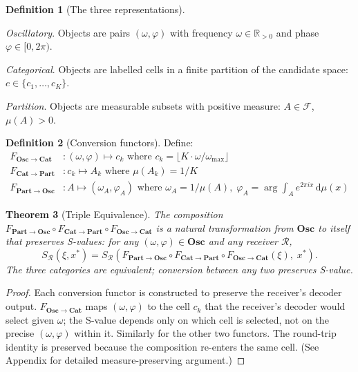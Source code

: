 \documentclass[twocolumn,11pt,a4paper]{article}
\newtheorem{theorem}{Theorem}[section]
\theoremstyle{definition}
\newtheorem{definition}[theorem]{Definition}
\theoremstyle{remark}
\newcommand{\Recv}{\mathcal{R}}
\newcommand{\Osc}{\mathbf{Osc}}
\newcommand{\Cat}{\mathbf{Cat}}
\newcommand{\Part}{\mathbf{Part}}
\begin{document}
\begin{definition}[The three representations]
\label{def:threereps}
\begin{description}[noitemsep,topsep=2pt]
\item[$\Osc$:] \emph{Oscillatory}. Objects are pairs $(\omega, \varphi)$
  with frequency $\omega \in \mathbb{R}_{>0}$ and phase $\varphi \in
  [0, 2\pi)$.
\item[$\Cat$:] \emph{Categorical}. Objects are labelled cells in a finite
  partition of the candidate space: $c \in \{c_1, \ldots, c_K\}$.
\item[$\Part$:] \emph{Partition}. Objects are measurable subsets with
  positive measure: $A \in \mathscr{F}$, $\mu(A) > 0$.
\end{description}
\end{definition}

\begin{definition}[Conversion functors]
Define:
\begin{align*}
F_{\Osc \to \Cat} &: (\omega, \varphi) \mapsto c_k
  \text{ where } c_k = \lfloor K \cdot \omega / \omega_{\max} \rfloor\\
F_{\Cat \to \Part} &: c_k \mapsto A_k
  \text{ where } \mu(A_k) = 1/K\\
F_{\Part \to \Osc} &: A \mapsto (\omega_A, \varphi_A)
  \text{ where } \omega_A = 1/\mu(A),\; \varphi_A = \arg\int_A e^{2\pi i x}\,\mathrm{d}\mu(x)
\end{align*}
\end{definition}

\begin{theorem}[Triple Equivalence]
\label{thm:triple}
The composition $F_{\Part \to \Osc} \circ F_{\Cat \to \Part} \circ
F_{\Osc \to \Cat}$ is a natural transformation from $\Osc$ to itself
that preserves S-values: for any $(\omega,\varphi) \in \Osc$ and any
receiver $\Recv$,
\[
S_\Recv(\xi, x^*) = S_\Recv(F_{\Part \to \Osc} \circ
F_{\Cat \to \Part} \circ F_{\Osc \to \Cat}(\xi),\; x^*).
\]
The three categories are equivalent; conversion between any two
preserves S-value.
\end{theorem}
\begin{proof}
Each conversion functor is constructed to preserve the receiver's
decoder output.  $F_{\Osc \to \Cat}$ maps $(\omega,\varphi)$ to the
cell $c_k$ that the receiver's decoder would select given $\omega$;
the S-value depends only on which cell is selected, not on the precise
$(\omega,\varphi)$ within it.  Similarly for the other two functors.
The round-trip identity is preserved because the composition
re-enters the same cell.  (See Appendix for detailed measure-preserving
argument.)
\end{proof}
\end{document}
